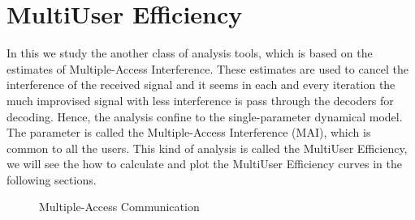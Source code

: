 \chapter{MultiUser Efficiency}
In this we study the another class of analysis tools, which is based on the estimates of Multiple-Access Interference. These estimates are used to cancel the interference of the received signal and it seems in each and every iteration the much improvised signal with less interference is pass through the decoders for decoding. Hence, the analysis confine to the single-parameter dynamical model. The parameter is called the Multiple-Access Interference (MAI), which is common to all the users. This kind of analysis is called the MultiUser Efficiency, we will see the how to calculate and plot the MultiUser Efficiency curves in the following sections.
\begin{figure}[htb]
  \centerline{  }
  \caption{Multiple-Access Communication}
\end{figure}
